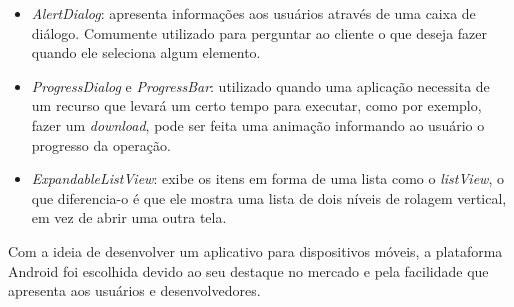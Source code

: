 \begin{itemize}
		  \item \textit{AlertDialog}: apresenta informações aos usuários através de
		  uma caixa de diálogo. Comumente utilizado para perguntar ao cliente o que
		  deseja fazer quando ele seleciona algum elemento.
		
		  \item \textit{ProgressDialog} e \textit{ProgressBar}: utilizado quando uma
		  aplicação necessita de um recurso que levará um certo tempo para executar,
		  como por exemplo, fazer um \textit{download}, pode ser feita uma animação
		  informando ao usuário o progresso da operação.
		  
		  \item \textit{ExpandableListView}: exibe os itens em forma de uma lista
		  como o \textit{listView}, o que diferencia-o é que ele mostra uma lista de
		  dois níveis de rolagem vertical, em vez de abrir uma outra tela.

	\end{itemize}

\par Com a ideia de desenvolver um aplicativo para dispositivos móveis, a
plataforma Android foi escolhida devido ao seu destaque no mercado e pela
facilidade que apresenta aos usuários e desenvolvedores.